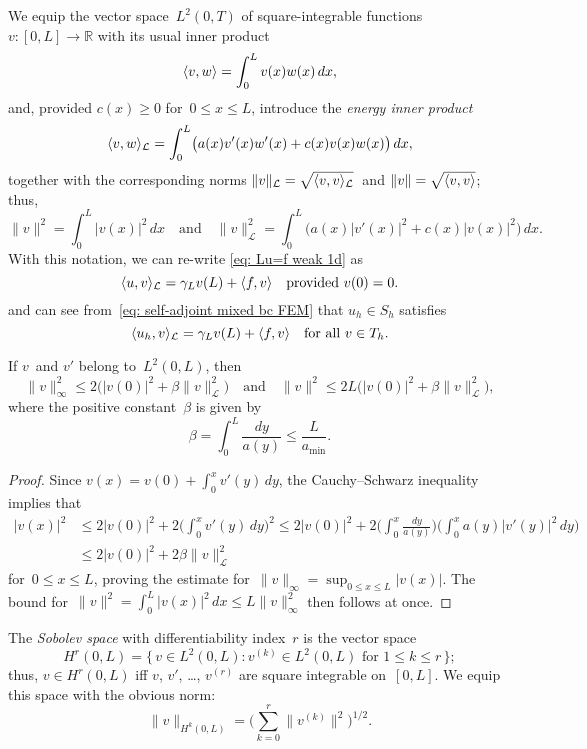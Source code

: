 We equip the vector space~$L^2(0,T)$ of square-integrable 
functions~$v:[0,L]\to\mathbb{R}$ with its usual inner product
\[
\langle v,w\rangle=\int_0^Lv(x)w(x)\,dx,
\]
and, provided $c(x)\ge0$ for~$0\le x\le L$, introduce the \emph{energy
inner product}
\begin{equation}\label{eq: energy iprod}
\langle v,w\rangle_{\mathcal{L}}=\int_0^L\bigl(a(x)v'(x)w'(x)+c(x)v(x)w(x)\bigr)\,dx,
\end{equation}
together with the corresponding norms
$\|v\|_{\mathcal{L}}=\sqrt{\langle v,v\rangle_{\mathcal{L}}}$~and
$\|v\|=\sqrt{\langle v,v\rangle}$; thus,
\[
\|v\|^2=\int_0^L|v(x)|^2\,dx
\quad\text{and}\quad
\|v\|_{\mathcal{L}}^2=\int_0^L\bigl(a(x)|v'(x)|^2+c(x)|v(x)|^2\bigr)\,dx.
\]
With this notation, we can re-write \eqref{eq: Lu=f weak 1d} as
\begin{equation}\label{eq: <u,v>A}
\langle u,v\rangle_{\mathcal{L}}=\gamma_Lv(L)+\langle f,v\rangle\quad\text{provided $v(0)=0$.}
\end{equation}
and can see from~\eqref{eq: self-adjoint mixed bc FEM} that $u_h\in S_h$
satisfies
\begin{equation}\label{eq: <uh,v>A}
\langle u_h,v\rangle_{\mathcal{L}}=\gamma_Lv(L)+\langle f,v\rangle
	\quad\text{for all $v\in T_h$.}
\end{equation}

\begin{lemma}\label{lem: v v'}
If $v$~and $v'$ belong to~$L^2(0,L)$, then
\[
\|v\|_\infty^2\le 2\bigl(|v(0)|^2+\beta\|v\|_{\mathcal{L}}^2\bigr)
\quad\text{and}\quad
\|v\|^2\le2L\bigl(|v(0)|^2+\beta\|v\|_{\mathcal{L}}^2\bigr),
\]
where the positive constant~$\beta$ is given by
\[
\beta=\int_0^L\frac{dy}{a(y)}\le\frac{L}{a_{\min}}.
\]
\end{lemma}
\begin{proof}
Since $v(x)=v(0)+\int_0^xv'(y)\,dy$, the Cauchy--Schwarz inequality implies that
\begin{align*}
|v(x)|^2&\le2|v(0)|^2+2\biggl(\int_0^x v'(y)\,dy\biggr)^2
\le2|v(0)|^2+2\biggl(\int_0^x\frac{dy}{a(y)}\biggr)
\biggl(\int_0^xa(y)|v'(y)|^2\,dy\biggr)\\
	&\le2|v(0)|^2+2\beta\|v\|_{\mathcal{L}}^2
\end{align*}
for~$0\le x\le L$, proving the estimate
for~$\|v\|_\infty=\sup_{0\le x\le L}|v(x)|$.  The bound
for~$\|v\|^2=\int_0^L|v(x)|^2\,dx\le L\|v\|_\infty^2$ then follows at once.
\end{proof}

The \emph{Sobolev space} with differentiability index~$r$ is the vector
space
\begin{equation}\label{eq: Hr 1d def}
H^r(0,L)=\{\,v\in L^2(0,L): \text{$v^{(k)}\in L^2(0,L)$ for $1\le k\le r$}\,\};
\end{equation}
thus, $v\in H^r(0,L)$ iff $v$, $v'$, \dots, $v^{(r)}$ are square integrable
on~$[0,L]$.  We equip this space with the obvious norm:
\[
\|v\|_{H^k(0,L)}=\biggl(\sum_{k=0}^r\|v^{(k)}\|^2\biggr)^{1/2}.
\]

